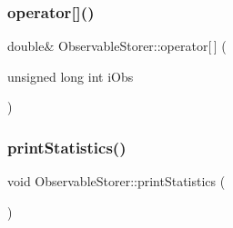 \subsubsection{\texorpdfstring{operator[]()}{operator[]()}}
{\footnotesize\ttfamily double\& Observable\+Storer\+::operator\mbox{[}$\,$\mbox{]} (\begin{DoxyParamCaption}\item[{unsigned long int}]{i\+Obs }\end{DoxyParamCaption})\hspace{0.3cm}{\ttfamily [inline]}}

\mbox{\label{class_observable_storer_a04a12e7da9e21d6947027230c953bffe}} 
\subsubsection{\texorpdfstring{printStatistics()}{printStatistics()}}
{\footnotesize\ttfamily void Observable\+Storer\+::print\+Statistics (\begin{DoxyParamCaption}{ }\end{DoxyParamCaption})}

